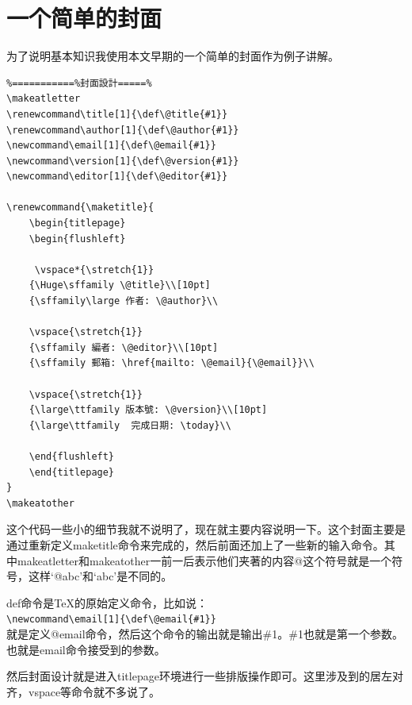 \documentclass[11pt,oneside]{book}
\begin{document}
\section{一个简单的封面}
为了说明基本知识我使用本文早期的一个简单的封面作为例子讲解。
\begin{Verbatim}
%===========%封面設計=====%
\makeatletter
\renewcommand\title[1]{\def\@title{#1}}
\renewcommand\author[1]{\def\@author{#1}}
\newcommand\email[1]{\def\@email{#1}}
\newcommand\version[1]{\def\@version{#1}}
\newcommand\editor[1]{\def\@editor{#1}}

\renewcommand{\maketitle}{
	\begin{titlepage}
	\begin{flushleft}
	
	 \vspace*{\stretch{1}}
    {\Huge\sffamily \@title}\\[10pt]
    {\sffamily\large 作者: \@author}\\
    	
	\vspace{\stretch{1}}
	{\sffamily 編者: \@editor}\\[10pt]
	{\sffamily 郵箱: \href{mailto: \@email}{\@email}}\\
	
	\vspace{\stretch{1}}
	{\large\ttfamily 版本號: \@version}\\[10pt]
	{\large\ttfamily  完成日期: \today}\\
	
	\end{flushleft}
	\end{titlepage}
}
\makeatother
\end{Verbatim}
这个代码一些小的细节我就不说明了，现在就主要内容说明一下。这个封面主要是通过重新定义maketitle命令来完成的，然后前面还加上了一些新的输入命令。其中makeatletter和makeatother一前一后表示他们夹著的内容@这个符号就是一个符号，这样‘@abc’和‘abc’是不同的。

def命令是\TeX 的原始定义命令，比如说：\\
\verb+\newcommand\email[1]{\def\@email{#1}}+\\
就是定义@email命令，然后这个命令的输出就是输出\#{}1。\#{}1也就是第一个参数。也就是email命令接受到的参数。

然后封面设计就是进入titlepage环境进行一些排版操作即可。这里涉及到的居左对齐，vspace等命令就不多说了。
\end{document}
